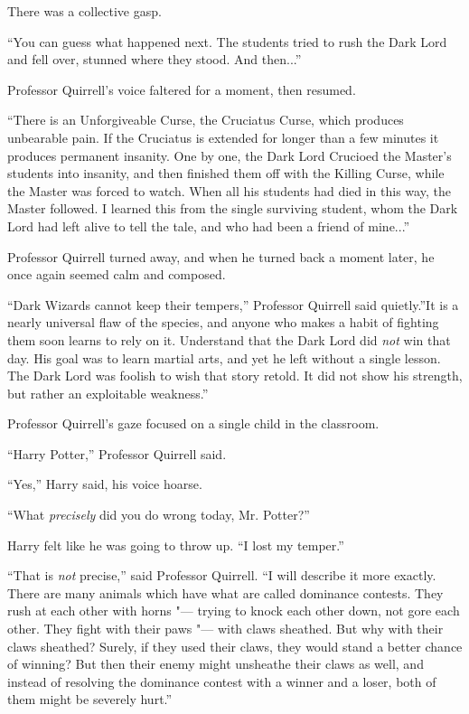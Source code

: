 There was a collective gasp.

``You can guess what happened next. The students tried to rush the Dark
Lord and fell over, stunned where they stood. And then...''

Professor Quirrell's voice faltered for a moment, then resumed.

``There is an Unforgiveable Curse, the Cruciatus Curse, which produces
unbearable pain. If the Cruciatus is extended for longer than a few
minutes it produces permanent insanity. One by one, the Dark Lord
Crucioed the Master's students into insanity, and then finished them off
with the Killing Curse, while the Master was forced to watch. When all
his students had died in this way, the Master followed. I learned this
from the single surviving student, whom the Dark Lord had left alive to
tell the tale, and who had been a friend of mine...''

Professor Quirrell turned away, and when he turned back a moment later,
he once again seemed calm and composed.

``Dark Wizards cannot keep their tempers,'' Professor Quirrell said
quietly.''It is a nearly universal flaw of the species, and anyone who
makes a habit of fighting them soon learns to rely on it. Understand
that the Dark Lord did \emph{not} win that day. His goal was to learn
martial arts, and yet he left without a single lesson. The Dark Lord was
foolish to wish that story retold. It did not show his strength, but
rather an exploitable weakness.''

Professor Quirrell's gaze focused on a single child in the classroom.

``Harry Potter,'' Professor Quirrell said.

``Yes,'' Harry said, his voice hoarse.

``What \emph{precisely} did you do wrong today, Mr. Potter?''

Harry felt like he was going to throw up. ``I lost my temper.''

``That is \emph{not} precise,'' said Professor Quirrell. ``I will
describe it more exactly. There are many animals which have what are
called dominance contests. They rush at each other with horns "--- trying
to knock each other down, not gore each other. They fight with their
paws "--- with claws sheathed. But why with their claws sheathed? Surely,
if they used their claws, they would stand a better chance of winning?
But then their enemy might unsheathe their claws as well, and instead of
resolving the dominance contest with a winner and a loser, both of them
might be severely hurt.''


